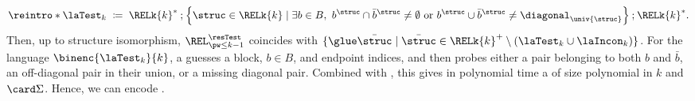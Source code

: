 \documentclass[a4paper,UKenglish,cleveref, autoref, thm-restate]{lipics-v2021}
\DeclarePairedDelimiter\set{\{}{\}}
\newcommand{\defeq}{\coloneq}
\newcommand{\mul}[1]{\bar{#1}}
\newcommand{\compo}{\mathbin{;}}
\newcommand{\vsig}{\Sigma}
\begin{document}
\AP
{}
\[\reintro*\laTest_{k} \;\defeq\;
\RELk{k}^{*} \compo
\set*{\struc \in \RELk{k} \mid \exists b \in B,\
b^{\struc} \cap \bar{b}^{\struc} \neq \emptyset
\text{ or } b^{\struc} \cup \bar{b}^{\struc} \neq \diagonal_{\univ{\struc}} } \compo
\RELk{k}^{*}.\]
Then, up to structure isomorphism,
$\REL^{\resTest}_{\pw \le k-1}$ coincides with
$\set{\glue \mul{\struc} \mid \mul{\struc} \in \RELk{k}^{+} \setminus (\laTest_{k} \cup \laIncon_{k})}$.
For the language $\binenc{\laTest_{k}}{k}$,
a  guesses a block, $b\in B$, and endpoint indices, and then probes either
a pair belonging to both $b$ and $\bar b$, an off-diagonal pair in their union,
or a missing diagonal pair.
Combined with , this gives in polynomial time
a \kl{2AFA} of size polynomial in $k$ and $\card\vsig$.
Hence, we can encode .
\end{document}
